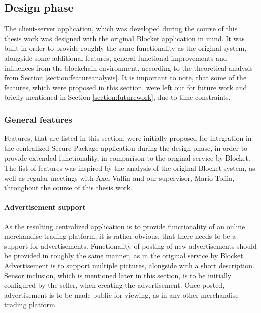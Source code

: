 \subsection{Design phase} 

The client-server application, which was developed during the course of this thesis work was designed with the original Blocket application in mind. It was built in order to provide roughly the same functionality as the original system, alongside some additional features, general functional improvements and influences from the blockchain environment, according to the theoretical analysis from Section \ref{section:featureanalysis}. It is important to note, that some of the features, which were proposed in this section, were left out for future work and briefly mentioned in Section \ref{section:futurework}, due to time constraints.

\subsubsection{General features} \label{section:features}

Features, that are listed in this section, were initially proposed for integration in the centralized Secure Package application during the design phase, in order to provide extended functionality, in comparison to the original service by Blocket. The list of features was inspired by the analysis of the original Blocket system, as well as regular meetings with Axel Vallin and our supervisor, Mario Toffia, throughout the course of this thesis work.

\paragraph{Advertisement support}
As the resulting centralized application is to provide functionality of an online merchandise trading platform, it is rather obvious, that there needs to be a support for advertisements. Functionality of posting of new advertisements should be provided in roughly the same manner, as in the original service by Blocket. Advertisement is to support multiple pictures, alongside with a short description. Sensor inclusion, which is mentioned later in this section, is to be initially configured by the seller, when creating the advertisement. Once posted, advertisement is to be made public for viewing, as in any other merchandise trading platform.

